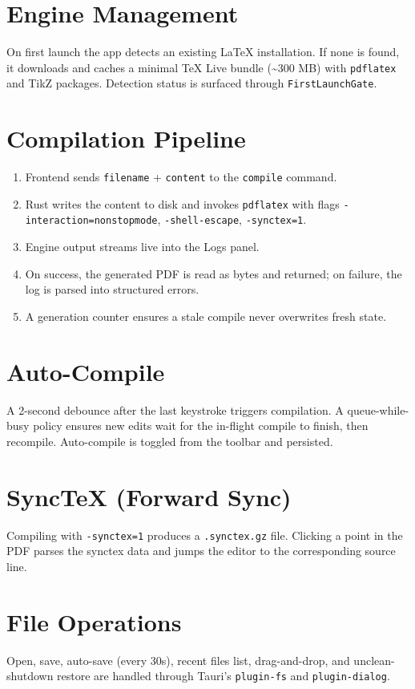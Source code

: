 \documentclass[11pt,a4paper]{report}
\begin{document}
\section{Engine Management}
On first launch the app detects an existing LaTeX installation. If none is found, it downloads and caches a minimal TeX Live bundle (\textasciitilde 300 MB) with \texttt{pdflatex} and TikZ packages. Detection status is surfaced through \texttt{FirstLaunchGate}.

\section{Compilation Pipeline}
\begin{enumerate}
  \item Frontend sends \texttt{filename} + \texttt{content} to the \texttt{compile} command.
  \item Rust writes the content to disk and invokes \texttt{pdflatex} with flags \texttt{-interaction=nonstopmode}, \texttt{-shell-escape}, \texttt{-synctex=1}.
  \item Engine output streams live into the Logs panel.
  \item On success, the generated PDF is read as bytes and returned; on failure, the log is parsed into structured errors.
  \item A generation counter ensures a stale compile never overwrites fresh state.
\end{enumerate}

\section{Auto-Compile}
A 2-second debounce after the last keystroke triggers compilation. A queue-while-busy policy ensures new edits wait for the in-flight compile to finish, then recompile. Auto-compile is toggled from the toolbar and persisted.

\section{SyncTeX (Forward Sync)}
Compiling with \texttt{-synctex=1} produces a \texttt{.synctex.gz} file. Clicking a point in the PDF parses the synctex data and jumps the editor to the corresponding source line.

\section{File Operations}
Open, save, auto-save (every 30s), recent files list, drag-and-drop, and unclean-shutdown restore are handled through Tauri's \texttt{plugin-fs} and \texttt{plugin-dialog}.
\end{document}

